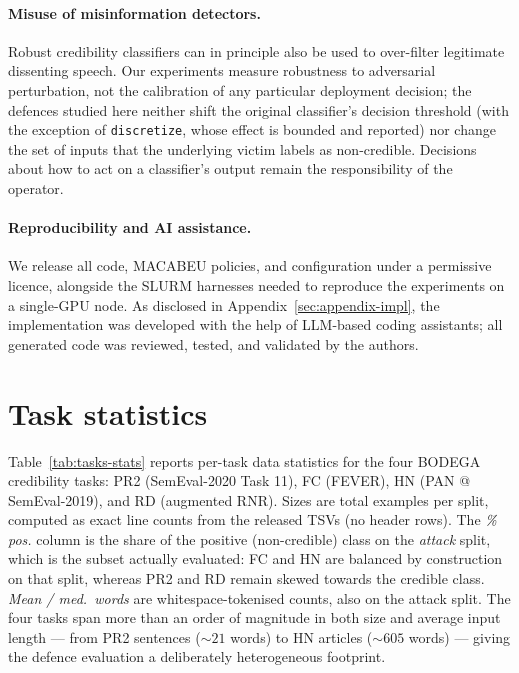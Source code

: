\documentclass[11pt]{article}
\begin{document}
\paragraph{Misuse of misinformation detectors.} Robust credibility classifiers can in principle also be used to over-filter legitimate dissenting speech. Our experiments measure robustness to adversarial perturbation, not the calibration of any particular deployment decision; the defences studied here neither shift the original classifier's decision threshold (with the exception of \texttt{discretize}, whose effect is bounded and reported) nor change the set of inputs that the underlying victim labels as non-credible. Decisions about how to act on a classifier's output remain the responsibility of the operator.

\paragraph{Reproducibility and AI assistance.} We release all code, MACABEU policies, and configuration under a permissive licence, alongside the SLURM harnesses needed to reproduce the experiments on a single-GPU node. As disclosed in Appendix~\ref{sec:appendix-impl}, the implementation was developed with the help of LLM-based coding assistants; all generated code was reviewed, tested, and validated by the authors.




\appendix
\section{Task statistics}
\label{sec:appendix-task-stats}

Table~\ref{tab:tasks-stats} reports per-task data statistics for the four BODEGA credibility tasks: PR2 (SemEval-2020 Task 11), FC (FEVER), HN (PAN @ SemEval-2019), and RD (augmented RNR). Sizes are total examples per split, computed as exact line counts from the released TSVs (no header rows). The \emph{\% pos.} column is the share of the positive (non-credible) class on the \emph{attack} split, which is the subset actually evaluated: FC and HN are balanced by construction on that split, whereas PR2 and RD remain skewed towards the credible class. \emph{Mean / med.\ words} are whitespace-tokenised counts, also on the attack split. The four tasks span more than an order of magnitude in both size and average input length --- from PR2 sentences ($\sim 21$ words) to HN articles ($\sim 605$ words) --- giving the defence evaluation a deliberately heterogeneous footprint.
\end{document}
